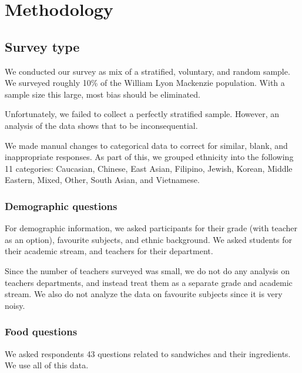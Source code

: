 \chapter{Methodology}

\section{Survey type}
We conducted our survey as mix of a stratified, voluntary, and random sample.
We surveyed roughly 10\% of the William Lyon Mackenzie population.
With a sample size this large, most bias should be eliminated.

Unfortunately, we failed to collect a perfectly stratified sample.
However, an analysis of the data shows that to be inconsequential.

We made manual changes to categorical data to correct for similar, blank, and inappropriate responses.
As part of this, we grouped ethnicity into the following 11 categories: Caucasian, Chinese, East Asian, Filipino, Jewish, Korean, Middle Eastern, Mixed, Other, South Asian, and Vietnamese.

\subsection*{Demographic questions}
For demographic information, we asked participants for their grade (with teacher as an option), favourite subjects, and ethnic background.
We asked students for their academic stream, and teachers for their department.

Since the number of teachers surveyed was small, we do not do any analysis on teachers departments, and instead treat them as a separate grade and academic stream.
We also do not analyze the data on favourite subjects since it is very noisy.

\subsection*{Food questions}
We asked respondents 43 questions related to sandwiches and their ingredients.
We use all of this data.
